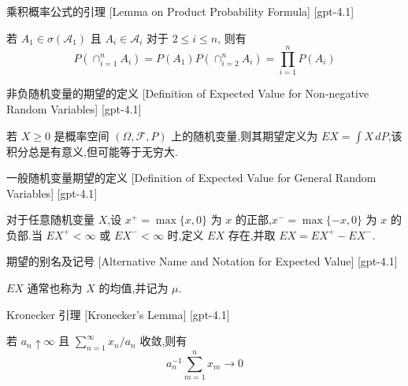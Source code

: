 \documentclass[UTF8]{ctexart}
\begin{document}
    
    
    \begin{lma}
        {乘积概率公式的引理}
        [Lemma on Product Probability Formula]
        [gpt-4.1]
        
若 $A_1 \in \sigma(\mathcal{A}_1)$ 且 $A_i \in {\mathcal{A}}_i$ 对于 $2 \leq i \leq n$, 则有
\[
P\left(\cap_{i=1}^{n} A_i\right) = P(A_1) P\left(\cap_{i=2}^{n} A_i\right) = \prod_{i=1}^{n} P(A_i)
\]

    \end{lma}
    
    
    
    \begin{dfn}
        {非负随机变量的期望的定义}
        [Definition of Expected Value for Non-negative Random Variables]
        [gpt-4.1]
        
若 $X \geq 0$ 是概率空间 $(\Omega, \mathcal{F}, P)$ 上的随机变量,则其期望定义为 $EX = \int X \, dP$,该积分总是有意义,但可能等于无穷大.

    \end{dfn}
    
    
    
    \begin{dfn}
        {一般随机变量期望的定义}
        [Definition of Expected Value for General Random Variables]
        [gpt-4.1]
        
对于任意随机变量 $X$,设 $x^+ = \operatorname{max}\{x, 0\}$ 为 $x$ 的正部,$x^- = \operatorname{max}\{-x, 0\}$ 为 $x$ 的负部.当 $EX^+ < \infty$ 或 $EX^- < \infty$ 时,定义 $EX$ 存在,并取 $EX = EX^+ - EX^-$.

    \end{dfn}
    
    
    
    \begin{dfn}
        {期望的别名及记号}
        [Alternative Name and Notation for Expected Value]
        [gpt-4.1]
        
$EX$ 通常也称为 $X$ 的均值,并记为 $\mu$.

    \end{dfn}
    
    
    
    \begin{thm}
        {Kronecker 引理}
        [Kronecker's Lemma]
        [gpt-4.1]
        
若 $a_{n} \uparrow \infty$ 且 $\sum_{n=1}^{\infty} x_{n} / a_{n}$ 收敛,则有
\[
a_{n}^{-1} \sum_{m=1}^{n} x_{m} \to 0
\]

    \end{thm}
    
\end{document}
